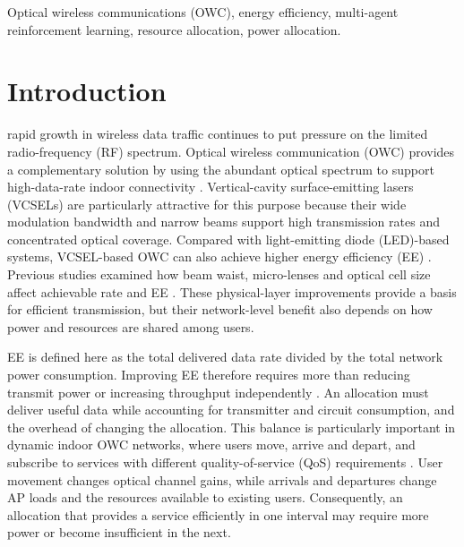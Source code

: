 \documentclass[journal]{IEEEtran}
\begin{document}
\begin{IEEEkeywords}
Optical wireless communications (OWC), energy efficiency, multi-agent reinforcement learning, resource allocation, power allocation.
\end{IEEEkeywords}

\section{Introduction}
\label{sec:introduction}

 rapid growth in wireless data traffic continues to put pressure on the limited radio-frequency (RF) spectrum. Optical wireless communication (OWC) provides a complementary solution by using the abundant optical spectrum to support high-data-rate indoor connectivity \cite{Ncube2023EE,Chowdhury2018Survey,Soltani2023LiFi}. Vertical-cavity surface-emitting lasers (VCSELs) are particularly attractive for this purpose because their wide modulation bandwidth and narrow beams support high transmission rates and concentrated optical coverage. Compared with light-emitting diode (LED)-based systems, VCSEL-based OWC can also achieve higher energy efficiency (EE) \cite{Ncube2023EE}. Previous studies examined how beam waist, micro-lenses and optical cell size affect achievable rate and EE \cite{Ncube2022EE}. These physical-layer improvements provide a basis for efficient transmission, but their network-level benefit also depends on how power and resources are shared among users.

EE is defined here as the total delivered data rate divided by the total network power consumption. Improving EE therefore requires more than reducing transmit power or increasing throughput independently \cite{Murdock2014,Ncube2024Cells}. An allocation must deliver useful data while accounting for transmitter and circuit consumption, and the overhead of changing the allocation. This balance is particularly important in dynamic indoor OWC networks, where users move, arrive and depart, and subscribe to services with different quality-of-service (QoS) requirements \cite{Ncube2025Predictive}. User movement changes optical channel gains, while arrivals and departures change AP loads and the resources available to existing users. Consequently, an allocation that provides a service efficiently in one interval may require more power or become insufficient in the next.
\end{document}
